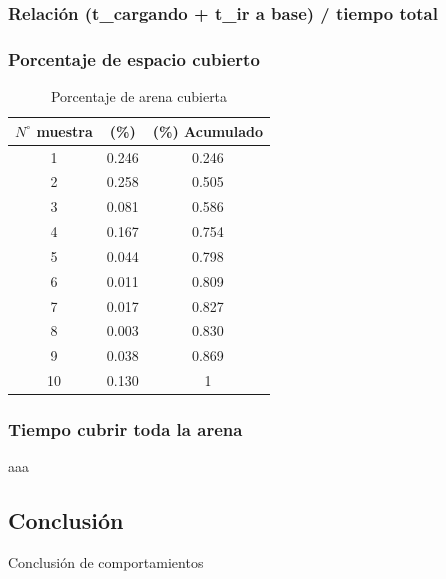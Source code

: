 \subsubsection{Relaci\'on (t\_cargando + t\_ir a base) / tiempo total}

\subsubsection{Porcentaje de espacio cubierto}
\begin{table}
	\begin{center}
		\begin{tabular}{|c||c|c|}
		\hline
			$N^\circ$ muestra & (\%) & (\%) Acumulado \\
		\hline
			1 & 0.246 & 0.246 \\
		\hline
			2 & 0.258 & 0.505 \\
		\hline
			3 & 0.081 & 0.586 \\
		\hline
			4 & 0.167 & 0.754 \\
		\hline
			5 & 0.044 & 0.798 \\
		\hline
			6 & 0.011 & 0.809 \\
		\hline
			7 & 0.017 & 0.827 \\
		\hline
			8 & 0.003 & 0.830 \\
		\hline
			9 & 0.038 & 0.869 \\
		\hline
			10 & 0.130 & 1 \\
		\hline
		\end{tabular}
	\end{center}
	\caption{Porcentaje de arena cubierta}
	\label{arena:covered}
\end{table}

\subsubsection{Tiempo cubrir toda la arena}
aaa

\newpage
\subsection{Conclusi\'on}
\label{comp_conclusion}
Conclusi\'on de comportamientos

